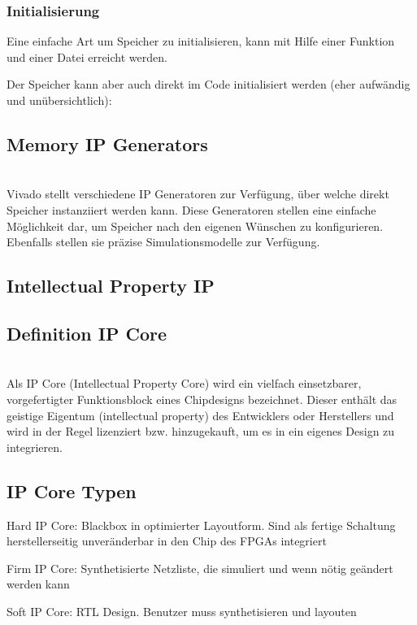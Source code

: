 \subsubsection{Initialisierung}
Eine einfache Art um Speicher zu initialisieren, kann mit Hilfe einer Funktion und einer Datei erreicht werden.


Der Speicher kann aber auch direkt im Code initialisiert werden (eher aufwändig und unübersichtlich):


\subsection{Memory IP Generators}$~$ \\
Vivado stellt verschiedene IP Generatoren zur Verfügung, über welche direkt Speicher instanziiert werden kann. Diese Generatoren stellen eine einfache Möglichkeit dar, um Speicher nach den eigenen Wünschen zu konfigurieren. Ebenfalls stellen sie präzise Simulationsmodelle zur Verfügung.

\subsection{Intellectual Property IP}
\begin{multicols}{2}
\subsection{Definition IP Core}$~$ \\
Als IP Core (Intellectual Property Core) wird ein vielfach einsetzbarer, vorgefertigter Funktionsblock eines Chipdesigns bezeichnet. Dieser enthält das geistige Eigentum (intellectual property) des Entwicklers oder Herstellers und wird in der Regel lizenziert bzw. hinzugekauft, um es in ein eigenes Design zu integrieren.

\vfill\null
\columnbreak

\subsection{IP Core Typen}
\begin{compactitem}
    \item Hard IP Core: Blackbox in optimierter Layoutform. Sind als fertige Schaltung herstellerseitig unveränderbar in den Chip des FPGAs integriert
    \item Firm IP Core: Synthetisierte Netzliste, die simuliert und wenn nötig geändert werden kann
    \item Soft IP Core: RTL Design. Benutzer muss synthetisieren und layouten
\end{compactitem}
\end{multicols}

